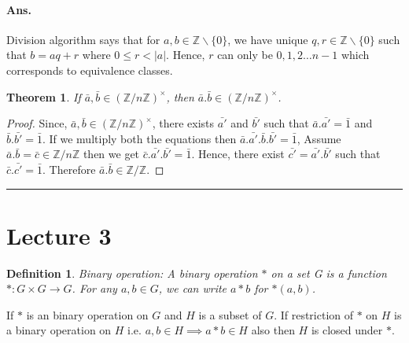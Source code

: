 \documentclass[12pt]{report}
\newtheorem{thm}{Theorem}
\newtheorem{defn}{Definition}
\begin{document}
\paragraph*{Ans. }Division algorithm says that for $a, b \in \mathbb{Z}\backslash\{0\}$, we have unique $q,r \in \mathbb{Z}\backslash \{0\}$ such that $b = aq + r$ where $ 0 \leq r < |a|$. Hence, $r$ can only be $ 0,1,2 \dots n-1$ which corresponds to equivalence classes.
\begin{thm}
    If $\bar{a},\bar{b} \in (\mathbb{Z}/n\mathbb{Z})^{\times}$, then $\bar{a}.\bar{b} \in (\mathbb{Z}/n\mathbb{Z})^{\times}$.
\end{thm}
\begin{proof}
    Since, $\bar{a},\bar{b} \in (\mathbb{Z}/n\mathbb{Z})^{\times}$, there exists $\bar{a'}$ and $\bar{b'}$ such that $\bar{a}.\bar{a'} = \bar{1}$ and $\bar{b}.\bar{b'} = \bar{1}$. If we multiply both the equations then $ \bar{a}.\bar{a'}.\bar{b}.\bar{b'} = \bar{1}$, Assume $\bar{a}.\bar{b} = \bar{c} \in \mathbb{Z}/n\mathbb{Z}$ then we get $\bar{c}.\bar{a'}.\bar{b'} = \bar{1}$. Hence, there exist $\bar{c'} = \bar{a'}.\bar{b'}$ such that $\bar{c}.\bar{c'} = \bar{1}$. Therefore $\bar{a}.\bar{b} \in \mathbb{Z}/\mathbb{Z}$.
\end{proof}
\hrule
\section*{Lecture 3}
\begin{defn}
    Binary operation: A binary operation $*$ on a set G is a function $*:G\times G \to G$. For any $a, b \in G$, we can write $a*b$ for $*(a,b)$. 
\end{defn}
If $*$ is an binary operation on $G$ and $H$ is a subset of $G$. If restriction of $*$ on $H$ is a binary operation on $H$ i.e. $a,b \in H \implies a*b \in H$ also then $H$ is closed under $*$.
\end{document}
